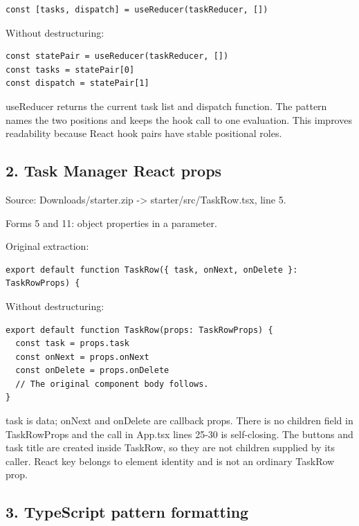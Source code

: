 \documentclass[
  10pt,
  a4paper,
]{article}
\begin{document}
\begin{lstlisting}
const [tasks, dispatch] = useReducer(taskReducer, [])
\end{lstlisting}

Without destructuring:

\begin{lstlisting}
const statePair = useReducer(taskReducer, [])
const tasks = statePair[0]
const dispatch = statePair[1]
\end{lstlisting}

useReducer returns the current task list and dispatch function. The
pattern names the two positions and keeps the hook call to one
evaluation. This improves readability because React hook pairs have
stable positional roles.

\subsection{2. Task Manager React
props}\label{2-task-manager-react-props}

Source: Downloads/starter.zip -\textgreater{} starter/src/TaskRow.tsx,
line 5.

Forms 5 and 11: object properties in a parameter.

Original extraction:

\begin{lstlisting}
export default function TaskRow({ task, onNext, onDelete }: TaskRowProps) {
\end{lstlisting}

Without destructuring:

\begin{lstlisting}
export default function TaskRow(props: TaskRowProps) {
  const task = props.task
  const onNext = props.onNext
  const onDelete = props.onDelete
  // The original component body follows.
}
\end{lstlisting}

task is data; onNext and onDelete are callback props. There is no
children field in TaskRowProps and the call in App.tsx lines 25-30 is
self-closing. The buttons and task title are created inside TaskRow, so
they are not children supplied by its caller. React key belongs to
element identity and is not an ordinary TaskRow prop.

\subsection{3. TypeScript pattern
formatting}\label{3-typescript-pattern-formatting}
\end{document}
